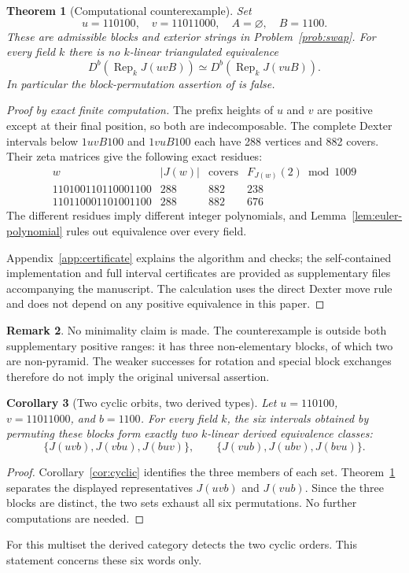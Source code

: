 \documentclass[11pt]{article}
\newtheorem{theorem}{Theorem}[section]
\newtheorem{corollary}[theorem]{Corollary}
\theoremstyle{definition}
\newtheorem{remark}[theorem]{Remark}
\newcommand{\Rep}{\operatorname{Rep}}
\newcommand{\Db}{D^b}
\begin{document}
\begin{theorem}[Computational counterexample]\label{thm:counterexample}
Set
\[
 u=110100,\quad v=11011000,\quad A=\varnothing,\quad B=1100.
\]
These are admissible blocks and exterior strings in
Problem~\ref{prob:swap}. For every field $k$ there is no $k$-linear
triangulated equivalence
\[
 \Db(\Rep_k J(uvB))\simeq\Db(\Rep_k J(vuB)).
\]
In particular the block-permutation assertion of
\cite[Section 9, Conjecture 9.1]{Chapoton} is false.
\end{theorem}
\begin{proof}[Proof by exact finite computation]
The prefix heights of $u$ and $v$ are positive except at their final
position, so both are indecomposable. The complete Dexter intervals
below $1uvB100$ and $1vuB100$ each have 288 vertices and 882 covers.
Their zeta matrices give the following exact residues:
\[
\begin{array}{c|r|r|r}
 w & |J(w)| & \text{covers} & F_{J(w)}(2)\bmod1009\\ \hline
 110100110110001100 & 288 & 882 & 238\\
 110110001101001100 & 288 & 882 & 676
\end{array}
\]
The different residues imply different integer polynomials, and
Lemma~\ref{lem:euler-polynomial} rules out equivalence over every field.

Appendix~\ref{app:certificate} explains the algorithm and checks;
the self-contained implementation and full interval certificates are
provided as supplementary files accompanying the manuscript.
The calculation uses the direct Dexter move rule and does not depend
on any positive equivalence in this paper.
\end{proof}

\begin{remark}
No minimality claim is made.
The counterexample is outside both supplementary positive ranges:
it has three non-elementary blocks, of which two are non-pyramid.
The weaker successes for rotation and special block exchanges therefore
do not imply the original universal assertion.
\end{remark}

\begin{corollary}[Two cyclic orbits, two derived types]\label{cor:two-cyclic-orbits}
Let $u=110100$, $v=11011000$, and $b=1100$. For every field $k$,
the six intervals obtained by permuting these blocks form exactly
two $k$-linear derived equivalence classes:
\[
 \{J(uvb),J(vbu),J(buv)\},\qquad
 \{J(vub),J(ubv),J(bvu)\}.
\]
\end{corollary}
\begin{proof}
Corollary~\ref{cor:cyclic} identifies the three members of each set.
Theorem~\ref{thm:counterexample} separates the displayed representatives
$J(uvb)$ and $J(vub)$. Since the three blocks are distinct, the two
sets exhaust all six permutations. No further computations are needed.
\end{proof}
For this multiset the derived category detects the two cyclic orders.
This statement concerns these six words only.
\end{document}

